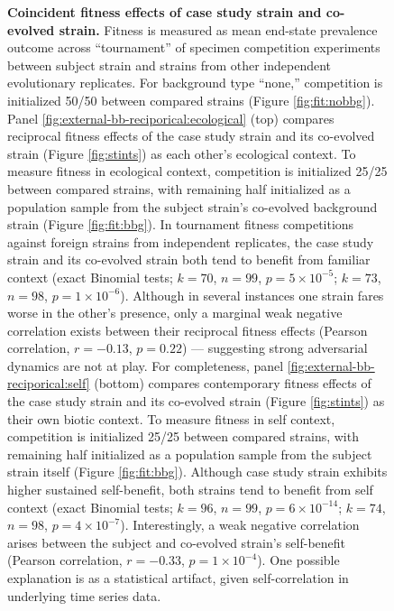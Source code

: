\begin{figure}
\caption{%
\textbf{Coincident fitness effects of case study strain and co-evolved strain.}
\footnotesize
Fitness is measured as mean end-state prevalence outcome across ``tournament'' of specimen competition experiments between subject strain and strains from other independent evolutionary replicates.
For background type ``none,'' competition is initialized 50/50 between compared strains (Figure \ref{fig:fit:nobbg}).
Panel \ref{fig:external-bb-reciporical:ecological} (top) compares reciprocal fitness effects of the case study strain and its co-evolved strain (Figure \ref{fig:stints}) as each other's ecological context.
To measure fitness in ecological context, competition is initialized 25/25 between compared strains, with remaining half initialized as a population sample from the subject strain's co-evolved background strain (Figure \ref{fig:fit:bbg}).
In tournament fitness competitions against foreign strains from independent replicates, the case study strain and its co-evolved strain both tend to benefit from familiar context (exact Binomial tests; $k=70$, $n=99$, $p=5\times10^{-5}$; $k=73$, $n=98$, $p=1\times10^{-6}$).
Although in several instances one strain fares worse in the other's presence, only a marginal weak negative correlation exists between their reciprocal fitness effects (Pearson correlation, $r=-0.13$, $p=0.22$) --- suggesting strong adversarial dynamics are not at play.
For completeness, panel \ref{fig:external-bb-reciporical:self} (bottom) compares contemporary fitness effects of the case study strain and its co-evolved strain (Figure \ref{fig:stints}) as their own biotic context.
To measure fitness in self context, competition is initialized 25/25 between compared strains, with remaining half initialized as a population sample from the subject strain itself (Figure \ref{fig:fit:bbg}).
Although case study strain exhibits higher sustained self-benefit, both strains tend to benefit from self context (exact Binomial tests; $k=96$, $n=99$, $p=6\times10^{-14}$; $k=74$, $n=98$, $p=4\times10^{-7}$).
Interestingly, a weak negative correlation arises between the subject and co-evolved strain's self-benefit (Pearson correlation, $r=-0.33$, $p=1\times10^{-4}$).
One possible explanation is as a statistical artifact, given self-correlation in underlying time series data.
}
\label{fig:external-bb-reciporical}
\end{figure}

